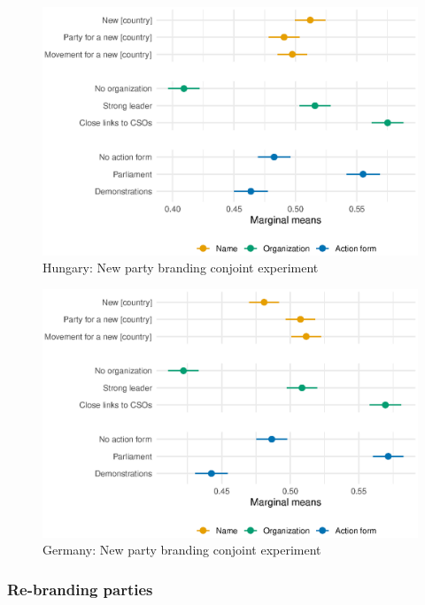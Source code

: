 \documentclass[12pt]{article}
\begin{document}
\begin{figure}[H]
\includegraphics[width=\textwidth]{./Figures/CJ1_main_tradeoff_Hungary.eps}
\caption{Hungary: New party branding conjoint experiment}
\end{figure}

\begin{figure}[H]
\includegraphics[width=\textwidth]{./Figures/CJ1_main_tradeoff_Germany.eps}
\caption{Germany: New party branding conjoint experiment}
\end{figure}

\subsubsection{Re-branding parties}
\end{document}
